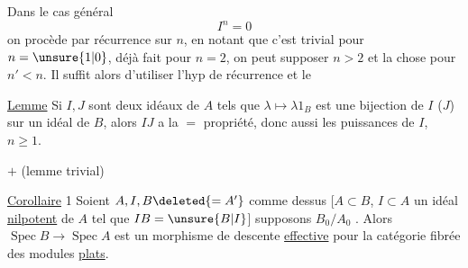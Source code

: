 Dans le cas général
\[
I^n=0
\]
on procède par récurrence sur $n$, en notant que c'est trivial pour $n=\unsure{1|0}$, déjà fait pour $n=2$, on peut supposer $n>2$ et la chose  pour $n'<n$.  Il suffit alors d'utiliser l'hyp de récurrence et le

\uline{Lemme} \quad Si $I,J$ sont deux idéaux de $A$ tels que $\lambda\mapsto\lambda 1_B$ est une bijection de $I$ ($J$) sur un idéal de $B$, alors $IJ$ a la $=$ propriété, donc aussi les puissances  de $I$,  $n\geq1$. 

$+$ \quad (lemme trivial)

\uline{Corollaire} 1 \quad Soient $A,I,B\deleted{=A'}$ comme dessus [$A\subset B$, $I\subset A$ un idéal \uline{nilpotent} de $A$ tel que $IB=\unsure{B|I}$]  supposons $B_0/A_0$  . Alors $\operatorname{Spec}B\longrightarrow\operatorname{Spec}A$ est un morphisme de descente \uline{effective} pour la catégorie fibrée des modules \uline{plats}.
